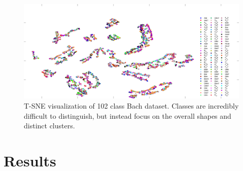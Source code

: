 \documentclass{beamer}
\begin{document}
\begin{frame}
	\begin{figure}
		\centering
		\includegraphics[width=0.9\linewidth]{figures/png/BachTSNE}
		\caption[T-SNE visualization of Bach dataset]{T-SNE visualization of 102 class Bach dataset.  Classes are incredibly difficult to distinguish, but instead focus on the overall shapes and distinct clusters.}
		\label{fig:bachtsne}
	\end{figure}
\end{frame}

\section{Results}
\end{document}
